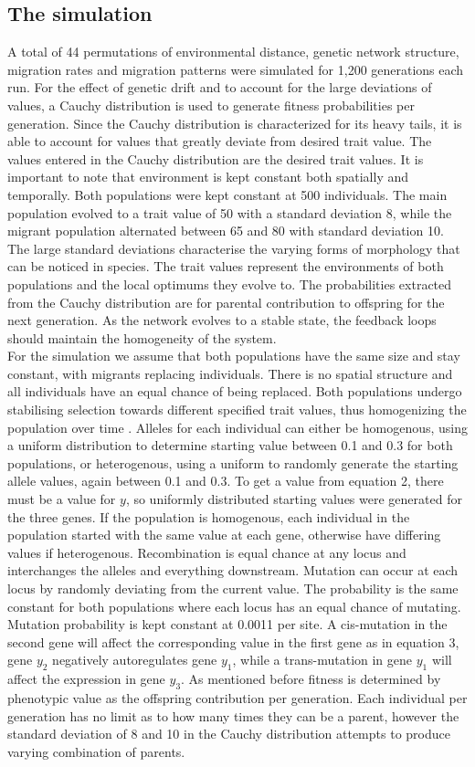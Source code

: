 \subsection{The simulation}
A total of 44 permutations of environmental distance, genetic network structure, migration rates and migration patterns were simulated for 1,200 generations each run. For the effect of genetic drift and to account for the large deviations of values, a Cauchy distribution is used to generate fitness probabilities per generation. Since the Cauchy distribution is characterized for its heavy tails, it is able to account for values that greatly deviate from desired trait value. The values entered in the Cauchy distribution are the desired trait values. It is important to note that environment is kept constant both spatially and temporally. Both populations were kept constant at 500 individuals. The main population evolved to a trait value of 50 with a standard deviation 8, while the migrant population alternated between 65 and 80 with standard deviation 10. The large standard deviations characterise the varying forms of morphology that can be noticed in species. The trait values represent the environments of both populations and the local optimums they evolve to. The probabilities extracted from the Cauchy distribution are for parental contribution to offspring for the next generation. As the network evolves to a stable state, the feedback loops should maintain the homogeneity of the system.
\\For the simulation we assume that both populations have the same size and stay constant, with migrants replacing individuals.  There is no spatial structure and all individuals have an equal chance of being replaced. Both populations undergo stabilising selection towards different specified trait values, thus homogenizing the population over time \cite{sato2006effect}. Alleles for each individual can either be homogenous, using a uniform distribution to determine starting value between 0.1 and 0.3 for both populations, or heterogenous, using a uniform to randomly generate the starting allele values, again between 0.1 and 0.3. To get a value from equation 2, there must be a value for $y$, so uniformly distributed starting values were generated for the three genes. If the population is homogenous, each individual in the population started with the same value at each gene, otherwise have differing values if heterogenous.
Recombination is equal chance at any locus and interchanges the alleles and everything downstream. Mutation can occur at each locus by randomly deviating from the current value. The probability is the same constant for both populations where each locus has an equal chance of mutating. Mutation probability is kept constant at 0.0011 per site. A cis-mutation in the second gene will affect the corresponding value in the first gene as in equation 3, gene $y_2$ negatively autoregulates gene $y_1$, while a trans-mutation in gene $y_1$ will affect the expression in gene $y_3$. As mentioned before fitness is determined by phenotypic value as the offspring contribution per generation. Each individual per generation has no limit as to how many times they can be a parent, however the standard deviation of 8 and 10 in the Cauchy distribution attempts to produce varying combination of parents.
